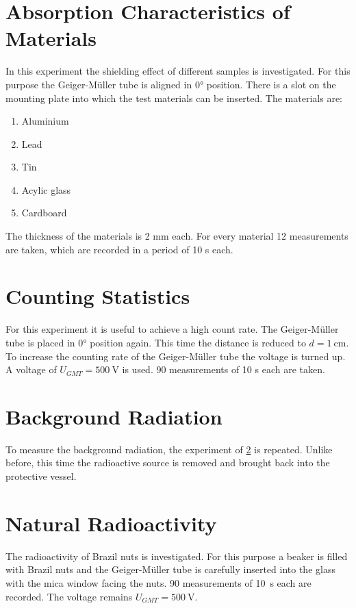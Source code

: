 \section{Absorption Characteristics of Materials}
In this experiment the shielding effect of different samples is investigated. For this purpose the Geiger-Müller tube is
aligned in 0° position. There is a slot on the mounting plate into which the test materials can be inserted. The
materials are:
\begin{enumerate}
	\item Aluminium
	\item Lead
	\item Tin
	\item Acylic glass
	\item Cardboard
\end{enumerate}
The thickness of the materials is 2 mm each. For every material 12 measurements are taken, which are recorded in a
period of 10 s each.
%
\section{Counting Statistics} \label{sec:count_stat}
For this experiment it is useful to achieve a high count rate. The Geiger-Müller tube is placed in 0° position again.
This time the distance is reduced to $d = 1\ \mathrm{cm}$. To increase the counting rate of the Geiger-Müller tube the
voltage is turned up. A voltage of $U_{GMT} = 500\ \mathrm{V}$ is used. 90 measurements of 10 s each are taken.
%
\section{Background Radiation}
To measure the background radiation, the experiment of \ref{sec:count_stat} is repeated. Unlike before, this time the
radioactive source is removed and brought back into the protective vessel.
%
\section{Natural Radioactivity}
%
The radioactivity of Brazil nuts is investigated. For this purpose a beaker is filled with Brazil nuts and the
Geiger-Müller tube is carefully inserted into the glass with the mica window facing the nuts. 90 measurements of \SI{10}{s}
each are recorded. The voltage remains $U_{GMT} = 500\ \mathrm{V}$.